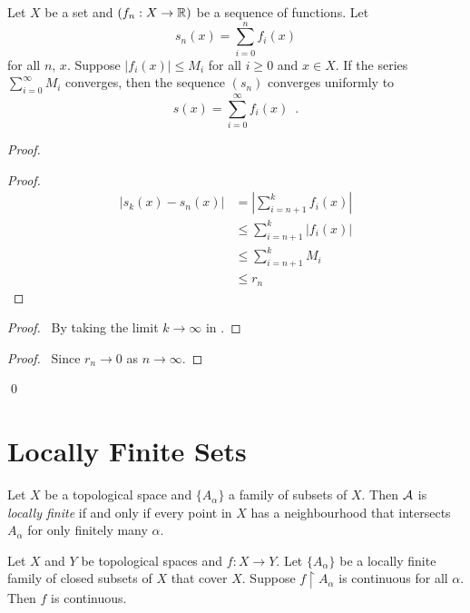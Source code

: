 \begin{theorem}
    Let $X$ be a set and $(f_n : X \rightarrow \RR)$ be a sequence of functions. Let
    \[ s_n(x) = \sum_{i=0}^n f_i(x) \]
    for all $n$, $x$. Suppose $|f_i(x)| \leq M_i$ for all $i \geq 0$ and $x \in X$.
    If the series $\sum_{i=0}^\infty M_i$ converges, then the sequence $(s_n)$ converges uniformly to
    \[ s(x) = \sum_{i=0}^\infty f_i(x) \enspace . \]
\end{theorem}

\begin{proof}
    \pf
    \begin{proof}
        \pf
        \begin{align*}
            |s_k(x) - s_n(x)| & = |\sum_{i=n+1}^k f_i(x)| \\
            & \leq \sum_{i=n+1}^k |f_i(x)| \\
            & \leq \sum_{i=n+1}^k M_i \\
            & \leq r_n
        \end{align*}
    \end{proof}
    \begin{proof}
        \pf\ By taking the limit $k \rightarrow \infty$ in .
    \end{proof}
    \qedstep
    \begin{proof}
        \pf\ Since $r_n \rightarrow 0$ as $n \rightarrow \infty$.
    \end{proof}
    \qed
\end{proof}

\section{Locally Finite Sets}

\begin{definition}
    Let $X$ be a topological space and $\{ A_\alpha \}$ a family of subsets of $X$. Then $\AA$ is \emph{locally finite} if and only if every point in $X$ has a neighbourhood that
    intersects $A_\alpha$ for only finitely many $\alpha$.
\end{definition}

\begin{theorem}
    Let $X$ and $Y$ be topological spaces and $f : X \rightarrow Y$. Let $\{ A_\alpha \}$ be a locally finite family of closed subsets of $X$ that cover $X$. Suppose $f \restriction A_\alpha$
    is continuous for all $\alpha$. Then $f$ is continuous.
\end{theorem}

